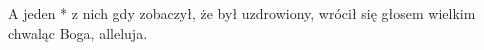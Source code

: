 A jeden * z nich gdy zobaczył, że był uzdrowiony, wrócił się głosem wielkim chwaląc Boga, alleluja.
